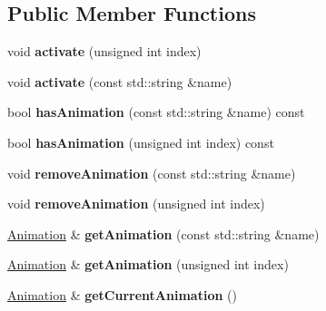 \subsection*{Public Member Functions}
\begin{DoxyCompactItemize}
\item 
\mbox{\label{classbkengine_1_1Element_aeef6831a59bc0362e9364209a96aecb3}} 
void {\bfseries activate} (unsigned int index)
\item 
\mbox{\label{classbkengine_1_1Element_ab2d7e750592b1f05034f2e2238e8f6da}} 
void {\bfseries activate} (const std\+::string \&name)
\item 
\mbox{\label{classbkengine_1_1Element_aeb0c71fe0902acf1ab112779b8aabbb7}} 
bool {\bfseries has\+Animation} (const std\+::string \&name) const
\item 
\mbox{\label{classbkengine_1_1Element_aad72daffeb6d69723a01a66eab504d27}} 
bool {\bfseries has\+Animation} (unsigned int index) const
\item 
\mbox{\label{classbkengine_1_1Element_a9b106b380f98527c0a06364e99e9701f}} 
void {\bfseries remove\+Animation} (const std\+::string \&name)
\item 
\mbox{\label{classbkengine_1_1Element_ad12990a7920262d3011078140a1ce2cc}} 
void {\bfseries remove\+Animation} (unsigned int index)
\item 
\mbox{\label{classbkengine_1_1Element_a56be6de0352ac3a0ca487b6f49fed84e}} 
\hyperlink{classbkengine_1_1Animation}{Animation} \& {\bfseries get\+Animation} (const std\+::string \&name)
\item 
\mbox{\label{classbkengine_1_1Element_aad7101318ccb2dd833491f1cdd07c13c}} 
\hyperlink{classbkengine_1_1Animation}{Animation} \& {\bfseries get\+Animation} (unsigned int index)
\item 
\mbox{\label{classbkengine_1_1Element_a78aa2eaf1f376cd3f65278303efb1f30}} 
\hyperlink{classbkengine_1_1Animation}{Animation} \& {\bfseries get\+Current\+Animation} ()

\end{DoxyCompactItemize}
